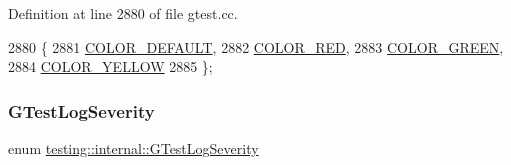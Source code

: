 Definition at line 2880 of file gtest.\+cc.


\begin{DoxyCode}
2880                 \{
2881   \hyperlink{namespacetesting_1_1internal_a648c1bc94c2ef9e868ff3f9dff0f9c4eafcd8803dc9e37e374d5a4486afc230b7}{COLOR\_DEFAULT},
2882   \hyperlink{namespacetesting_1_1internal_a648c1bc94c2ef9e868ff3f9dff0f9c4ea9ebb3ddab9391781f6ee5021e1e443c3}{COLOR\_RED},
2883   \hyperlink{namespacetesting_1_1internal_a648c1bc94c2ef9e868ff3f9dff0f9c4ea3b1e81f5b14a17b35a8672d57d166507}{COLOR\_GREEN},
2884   \hyperlink{namespacetesting_1_1internal_a648c1bc94c2ef9e868ff3f9dff0f9c4ea2cca441161aca75a208ff08d07f5b1a5}{COLOR\_YELLOW}
2885 \};
\end{DoxyCode}
\mbox{\label{namespacetesting_1_1internal_aa6255ef3b023c5b4e1a2198d887fb977}} 
\subsubsection{\texorpdfstring{G\+Test\+Log\+Severity}{GTestLogSeverity}}
{\footnotesize\ttfamily enum \hyperlink{namespacetesting_1_1internal_aa6255ef3b023c5b4e1a2198d887fb977}{testing\+::internal\+::\+G\+Test\+Log\+Severity}}

